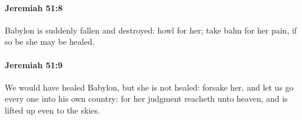 		\paragraph{Jeremiah 51:8} %
			\label{JEREMIAH-51-8}

			Babylon is suddenly fallen and destroyed: howl for her; take balm for her pain, if so be she may be healed.


		\paragraph{Jeremiah 51:9} %
			\label{JEREMIAH-51-9}

			We would have healed Babylon, but she is not healed: forsake her, and let us go every one into his own country: for her judgment reacheth unto heaven, and is lifted up even to the skies.


